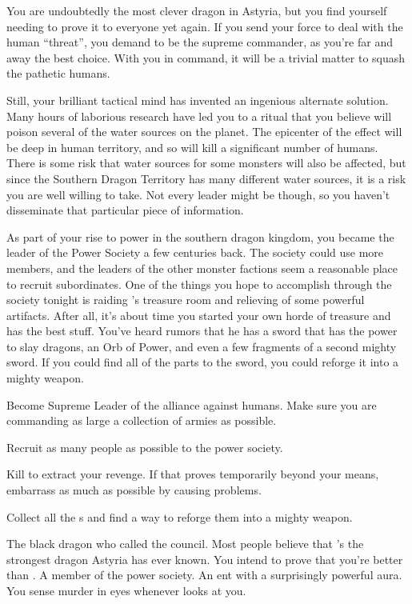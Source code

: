 \documentclass[char]{guildcamp2}
\begin{document}
You are undoubtedly the most clever dragon in Astyria, but you find yourself needing to prove it to everyone yet again. If you send your force to deal with the human ``threat'', you demand to be the supreme commander, as you're far and away the best choice.  With you in command, it will be a trivial matter to squash the pathetic humans.

Still, your brilliant tactical mind has invented an ingenious alternate solution. Many hours of laborious research have led you to a ritual that you believe will poison several of the water sources on the planet. The  epicenter of the effect will be deep in human territory, and so will kill a significant number of humans. There is some risk that water sources for some monsters will also be affected, but since the Southern Dragon Territory has many different water sources, it is a risk you are well willing to take. Not every leader might be though, so you haven't disseminate that particular piece of information.
		
As part of your rise to power in the southern dragon kingdom, you became the leader of the Power Society a few centuries back. The society could use more members, and the leaders of the other monster factions seem a reasonable place to recruit subordinates. One of the things you hope to accomplish through the society tonight is raiding \cOnyx{}'s treasure room and relieving \cOnyx{\them} of some powerful artifacts. After all, it's about time you started your own horde of treasure and \cOnyx{} has the best stuff. You've heard rumors that he has a sword that has the power to slay dragons, an Orb of Power, and even a few fragments of a second mighty sword. If you could find all of the parts to the sword, you could reforge it into a mighty weapon.		

	\begin{itemz}[Goals]
	\item Become Supreme Leader of the alliance against humans. Make sure you are commanding as large a collection of armies as possible.
	\item Recruit as many people as possible to the power society.
	\item Kill \cOnyx{} to extract your revenge. If that proves temporarily beyond your means, embarrass \cOnyx{} as much as possible by causing problems.
	\item Collect all the \iVorpalSwordofWonder{}s and find a way to reforge them into a mighty weapon.
\end{itemz}

\begin{contacts}
  \contact{\cOnyx{}} The black dragon who called the council. Most people believe that \cOnyx{\they}'s the strongest dragon Astyria has ever known. You intend to prove that you're better than \cOnyx{\them}.
	\contact{\cMinotaur{}} A member of the power society.
	\contact{\cEnt{}} An ent with a surprisingly powerful aura. You sense murder in \cEnt{\their} eyes whenever \cEnt{\they} looks at you.
\end{contacts}
\end{document}
